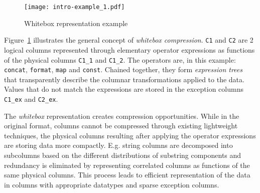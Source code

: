 \begin{figure}[h]
  \centering
  \texttt{[image: intro-example\_1.pdf]}
  \caption{Whitebox representation example}
  \label{fig:intro:whitebox:example}
\end{figure}

Figure~\ref{fig:intro:whitebox:example} illustrates the general concept of \textit{whitebox compression}. \verb|C1| and \verb|C2| are 2 logical columns represented through elementary operator expressions as functions of the physical columns \verb|C1_1| and \verb|C1_2|. The operators are, in this example: \verb|concat|, \verb|format|, \verb|map| and \verb|const|. Chained together, they form \textit{expression trees} that transparently describe the columnar transformations applied to the data. Values that do not match the expressions are stored in the exception columns \verb|C1_ex| and \verb|C2_ex|.

The \textit{whitebox} representation creates compression opportunities. While in the original format, columns cannot be compressed through existing lightweight techniques, the physical columns resulting after applying the operator expressions are storing data more compactly. E.g. string columns are decomposed into subcolumns based on the different distributions of substring components and redundancy is eliminated by representing correlated columns as functions of the same physical columns. This process leads to efficient representation of the data in columns with appropriate datatypes and sparse exception columns.



